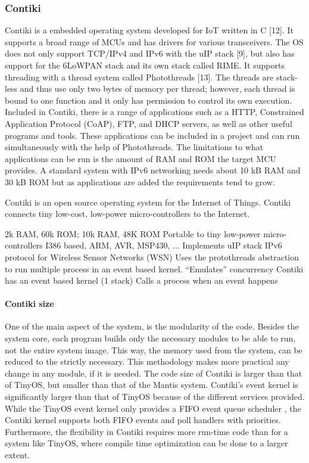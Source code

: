 \subsubsection{Contiki}

Contiki is a embedded operating system developed for IoT written in C [12].
It supports a broad range of MCUs and has drivers for various transceivers.
The OS does not only support TCP/IPv4 and IPv6 with the uIP stack [9],
	but also has support for the 6LoWPAN stack and its own stack called RIME.
It supports threading with a thread system called Photothreads [13].
The threads are stack-less and thus use only two bytes of memory per thread;
	however,
	each thread is bound to one function and it only has permission to control its own execution.
Included in Contiki,
	there is a range of applications such as a HTTP,
	Constrained Application Protocol (CoAP),
	FTP,
	and DHCP servers,
	as well as other useful programs and tools.
These applications can be included in a project and can run simultaneously with the help of Photothreads.
The limitations to what applications can be run is the amount of RAM and ROM the target MCU provides.
A standard system with IPv6 networking needs about 10 kB RAM and 30 kB ROM but as applications are added the requirements tend to grow.


Contiki is an open source operating system for the Internet of Things.
Contiki connects tiny low-cost,
	low-power micro-controllers to the Internet.

2k RAM, 60k ROM; 10k RAM, 48K ROM
Portable to tiny low-power micro-controllers
I386 based, ARM, AVR, MSP430, ...
Implements uIP stack
IPv6 protocol for Wireless Sensor Networks (WSN)
Uses the protothreads abstraction to run multiple process in an event based
kernel.
“Emulates” concurrency
Contiki has an event based kernel (1 stack)
Calls a process when an event happens

\paragraph*{Contiki size}

One of the main aspect of the system,
	is the modularity of the code.
Besides the system core,
	each program builds only the necessary modules to be able to run,
	not the entire system image.
This way,
	the memory used from the system,
	can be reduced to the strictly necessary.
This methodology makes more practical any change in any module,
	if it is needed.
The code size of Contiki is larger than that of TinyOS,
	but smaller than that of the Mantis system.
Contiki's event kernel is significantly larger than that of TinyOS because of the different services provided.
While the TinyOS event kernel only provides a FIFO event queue scheduler ,
	the Contiki kernel supports both FIFO events and poll handlers with priorities.
Furthermore,
	the flexibility in Contiki requires more run-time code than for a system like TinyOS,
	where compile time optimization can be done to a larger extent.


